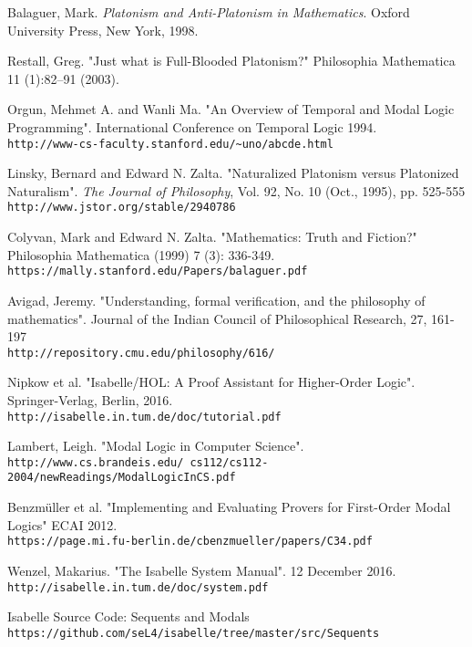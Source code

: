 \documentclass[12pt]{article}
\theoremstyle{definition}
\begin{document}
\begin{thebibliography}{9}
Balaguer, Mark.
\textit{Platonism and Anti-Platonism in Mathematics}. 
Oxford University Press, New York, 1998.
 
Restall, Greg. 
"Just what is Full-Blooded Platonism?"
Philosophia Mathematica 11 (1):82--91 (2003).
 
Orgun, Mehmet A. and Wanli Ma.
"An Overview of Temporal and Modal Logic Programming".
International Conference on Temporal Logic 1994.
\\\texttt{http://www-cs-faculty.stanford.edu/\~{}uno/abcde.html}

Linsky, Bernard and Edward N. Zalta.
"Naturalized Platonism versus Platonized Naturalism".
\textit{The Journal of Philosophy}, Vol. 92, No. 10 (Oct., 1995), pp. 525-555
\\\texttt{http://www.jstor.org/stable/2940786}

Colyvan, Mark and Edward N. Zalta. 
"Mathematics: Truth and Fiction?" 
Philosophia Mathematica (1999) 7 (3): 336-349.
\\\texttt{https://mally.stanford.edu/Papers/balaguer.pdf}

Avigad, Jeremy.
"Understanding, formal verification, and the philosophy of mathematics".
Journal of the Indian Council of Philosophical Research, 27, 161-197
\\\texttt{http://repository.cmu.edu/philosophy/616/}

Nipkow et al. 
"Isabelle/HOL: A Proof Assistant for Higher-Order Logic".
Springer-Verlag, Berlin, 2016.
\\\texttt{http://isabelle.in.tum.de/doc/tutorial.pdf}

Lambert, Leigh.
"Modal Logic in Computer Science".
\\\texttt{http://www.cs.brandeis.edu/~cs112/cs112-2004/newReadings/ModalLogicInCS.pdf}

Benzm\"uller et al.
"Implementing and Evaluating Provers for First-Order Modal Logics"
ECAI 2012.
\\\texttt{https://page.mi.fu-berlin.de/cbenzmueller/papers/C34.pdf}

Wenzel, Makarius.
"The Isabelle System Manual".
12 December 2016.
\\\texttt{http://isabelle.in.tum.de/doc/system.pdf}

Isabelle Source Code: Sequents and Modals
\\\texttt{https://github.com/seL4/isabelle/tree/master/src/Sequents}

\end{thebibliography}
\end{document}
